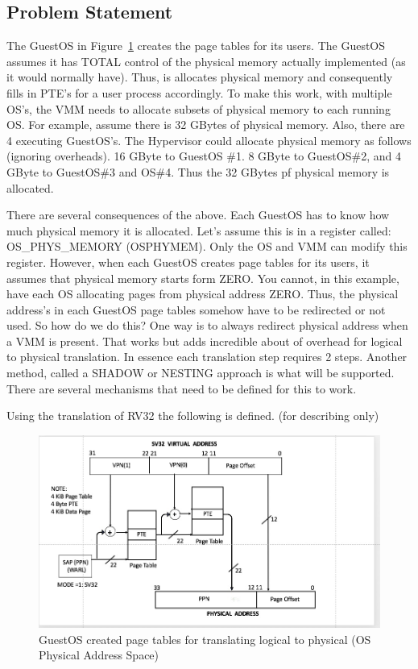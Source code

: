 \documentclass{article}
\begin{document}
\subsection{Problem Statement}

The GuestOS in Figure~\ref{fig:guest-logical-physical} creates the page tables for its users.  The GuestOS assumes it has TOTAL control of the physical memory actually implemented (as it would normally have).  Thus, is allocates physical memory and  consequently fills in PTE’s for a user process accordingly.    To make this work, with multiple OS’s,  the VMM needs to allocate subsets of physical memory to each running OS.  For example,  assume there is 32 GBytes of physical memory.  Also, there are 4 executing GuestOS’s.  The Hypervisor could allocate physical memory as follows (ignoring overheads).  16 GByte to GuestOS \#1.  8 GByte to GuestOS\#2,  and 4 GByte to GuestOS\#3 and OS\#4. Thus the 32 GBytes pf physical memory is allocated.  

There are several consequences of the above.  Each GuestOS has to know how much physical memory it is allocated.  Let’s assume this is in a register called:  OS\_PHYS\_MEMORY (OSPHYMEM).   Only the OS and VMM can modify this register.  However, when each GuestOS creates page tables for its users,  it assumes that physical memory starts form ZERO.  You cannot, in this example,  have each OS allocating pages from physical address ZERO. Thus, the physical address’s in each GuestOS page tables  somehow have to be redirected or not used. So how do we do this? One way is to always redirect physical address when a VMM is present.  That works but adds incredible about of overhead for logical to physical translation.  In essence each translation step requires 2 steps.  Another  method,   called a SHADOW or NESTING approach is what will be supported.  There are several mechanisms that need to be defined for this to work.

Using the translation of RV32 the following is defined. (for describing only)

\begin{figure}
\includegraphics[scale = .4]
{figures/figure7_rv32_pte.jpg}
\caption{GuestOS created page tables for translating logical to  physical (OS Physical Address Space)\label{fig:guest-logical-physical}}
\end{figure}
\end{document}
